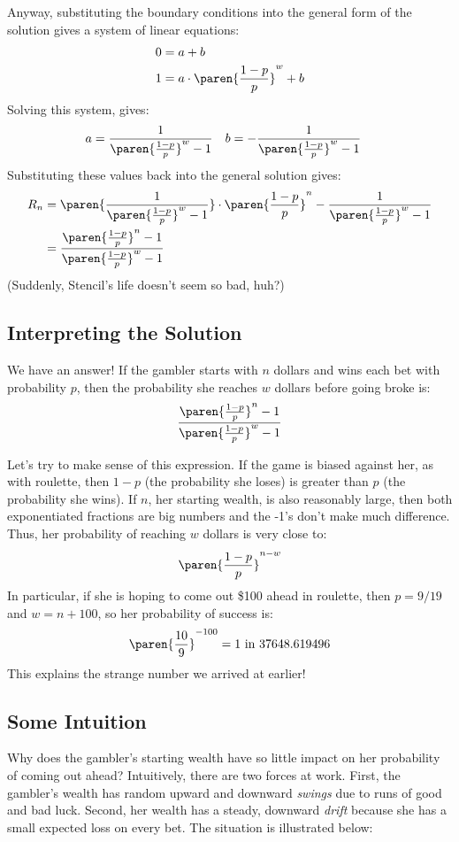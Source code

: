 Anyway, substituting the boundary conditions into the general form of
the solution gives a system of linear equations:
%
\begin{align*}
0 & = a + b \\
1 & = a \cdot \paren{\frac{1-p}{p}}^w + b
\end{align*}
%
Solving this system, gives:
%
\begin{align*}
a & = \frac{1}{\paren{\frac{1-p}{p}}^w-1} &
b & = - \frac{1}{\paren{\frac{1-p}{p}}^w-1} &
\end{align*}
%
Substituting these values back into the general solution gives:
%
\begin{align*}
R_n
    & = \paren{\frac{1}{\paren{\frac{1-p}{p}}^w-1}} \cdot
        \paren{\frac{1-p}{p}}^n - \frac{1}{\paren{\frac{1-p}{p}}^w-1} \\
    & = \frac{\paren{\frac{1-p}{p}}^n-1}{\paren{\frac{1-p}{p}}^w-1}
\end{align*}
%
(Suddenly, Stencil's life doesn't seem so bad, huh?)

\subsection{Interpreting the Solution}

We have an answer!  If the gambler starts with $n$ dollars and wins
each bet with probability $p$, then the probability she reaches $w$
dollars before going broke is:
%
\[
\frac{\paren{\frac{1-p}{p}}^n-1}{\paren{\frac{1-p}{p}}^w-1}
\]

Let's try to make sense of this expression.  If the game is biased
against her, as with roulette, then $1-p$ (the probability she loses)
is greater than $p$ (the probability she wins).  If $n$, her starting
wealth, is also reasonably large, then both exponentiated fractions
are big numbers and the -1's don't make much difference.  Thus, her
probability of reaching $w$ dollars is very close to:
%
\[
\paren{\frac{1-p}{p}}^{n-w}
\]
%
In particular, if she is hoping to come out \$100 ahead in roulette,
then $p = 9/19$ and $w = n + 100$, so her probability of success is:
%
\[
\paren{\frac{10}{9}}^{-100} = 1 \text{ in } 37648.619496
\]
%
This explains the strange number we arrived at earlier!

\subsection{Some Intuition}

Why does the gambler's starting wealth have so little impact on her
probability of coming out ahead?  Intuitively, there are two forces at
work.  First, the gambler's wealth has random upward and downward
\emph{swings} due to runs of good and bad luck.  Second, her wealth
has a steady, downward \emph{drift} because she has a small expected
loss on every bet.  The situation is illustrated below:
%
\begin{figure}[h]



\label{fig:19P3}

\end{figure}

